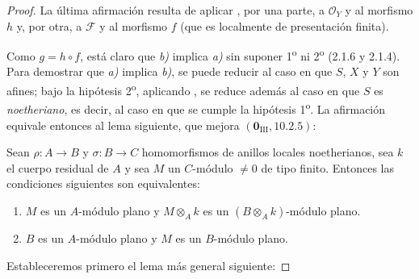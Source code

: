 \begin{proof}
La última afirmación resulta de aplicar , por una parte, a $\mathcal O_Y$ y al morfismo $h$ y, por otra, a $\mathcal F$ y al morfismo $f$ (que es localmente de presentación finita).

Como $g=h\circ f$, está claro que \emph{b)} implica \emph{a)} sin suponer 1\textsuperscript{o} ni 2\textsuperscript{o} (2.1.6 y 2.1.4). Para demostrar que \emph{a)} implica \emph{b)}, se puede reducir al caso en que $S$, $X$ y $Y$ son afines; bajo la hipótesis 2\textsuperscript{o}, aplicando , se reduce además al caso en que $S$ es \emph{noetheriano}, es decir, al caso en que se cumple la hipótesis 1\textsuperscript{o}. La afirmación equivale entonces al lema siguiente, que mejora $(\mathbf 0_{\mathrm{III}},10.2.5)$:

\begin{lemma}[11.3.10.1]
\label{IV.11.3.10.1}
Sean $\rho:A\to B$ y $\sigma:B\to C$ homomorfismos de anillos locales noetherianos, sea $k$ el cuerpo residual de $A$ y sea $M$ un $C$-módulo $\neq0$ de tipo finito. Entonces las condiciones siguientes son equivalentes:
\begin{enumerate}[label=\emph{\alph*)}]
  \item $M$ es un $A$-módulo plano y $M\otimes_Ak$ es un $(B\otimes_Ak)$-módulo plano.
  \item $B$ es un $A$-módulo plano y $M$ es un $B$-módulo plano.
\end{enumerate}
\end{lemma}

Estableceremos primero el lema más general siguiente:


\end{proof}
